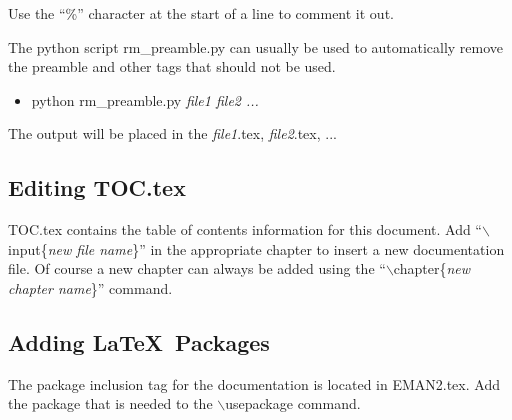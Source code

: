Use the ``\%'' character at the  start of a line to comment it out.

The python script rm\_preamble.py can usually be used to automatically remove
the preamble and other tags that should not be used.
\begin {itemize}
  \item[\%] python rm\_preamble.py \textit{file1 file2 ...}
\end{itemize}
The output will be placed in the \textit{file1}.tex,
\textit{file2}.tex, ...

\subsection{Editing TOC.tex} \label{ADDING-DOC-TOC}

TOC.tex contains the table of contents information for this document.
Add ``$\backslash$input\{\textit{new file name}\}'' in the appropriate
chapter to insert a new documentation file.
Of course a new chapter can always be added using the
``$\backslash$chapter\{\textit{new chapter name}\}'' command.


\subsection{Adding \LaTeX ~Packages}

The package inclusion tag for the documentation is located in
EMAN2.tex.  Add the package that is needed to the
$\backslash$usepackage command.
